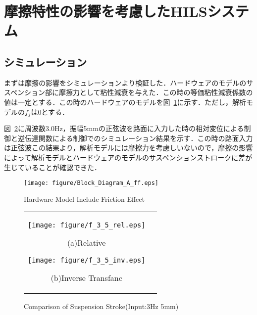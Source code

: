 \documentclass[a4paper,12pt]{article_vdlab_sotsuron}
\begin{document}
\newpage
\section{摩擦特性の影響を考慮したHILSシステム}
\subsection{シミュレーション}
まずは摩擦の影響をシミュレーションより検証した．ハードウェアのモデルのサスペンション部に摩擦力として粘性減衰を与えた．この時の等価粘性減衰係数の値は一定とする．この時のハードウェアのモデルを図~\ref{fig:sim_model_FRi}に示す．ただし，解析モデルの$f_f$は0とする．
\par
図~\ref{fig:fri_5_3}に周波数3.0Hz，振幅5mmの正弦波を路面に入力した時の相対変位による制御と逆伝達関数による制御でのシミュレーション結果を示す．この時の路面入力は正弦波この結果より，解析モデルには摩擦力を考慮しいないので，摩擦の影響によって解析モデルとハードウェアのモデルのサスペンションストロークに差が生じていることが確認できた．
\vspace*{10mm}
\begin{figure}[h]
  \begin{center}
    \texttt{[image: figure/Block\_Diagram\_A\_ff.eps]}
    \vspace*{3mm}
    \caption{Hardware Model Include Friction Effect}
    \label{fig:sim_model_FRi}
  \end{center}
\end{figure}
\begin{figure}[h]
  \begin{tabular}{cc}
  \begin{minipage}{0.5\hsize}
  \begin{center}
    \texttt{[image: figure/f\_3\_5\_rel.eps]}
    \end{center}
    \begin{center}
    \ (a)Relative\
    \end{center}
  \end{minipage}
  \begin{minipage}{0.5\hsize}
     \begin{center}
      \texttt{[image: figure/f\_3\_5\_inv.eps]}
      \end{center}
      \begin{center}
      \ (b)Inverse Transfanc\
    \end{center}
  \end{minipage}
  \end{tabular}
  \vspace*{3mm}
  \caption{Comparison of Suspension Stroke(Input:3Hz 5mm)}
    \label{fig:fri_5_3}
\end{figure}
\end{document}
